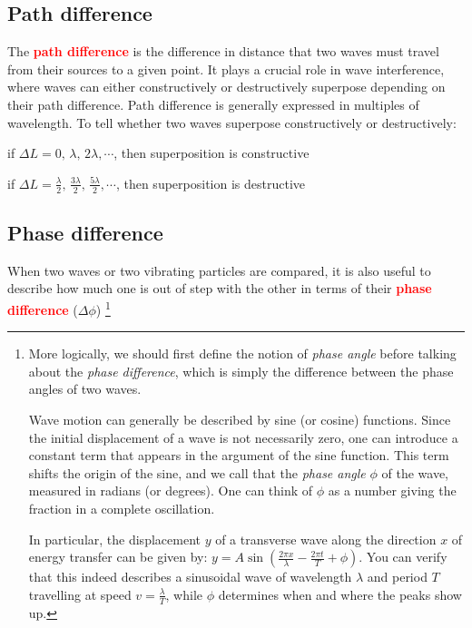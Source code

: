 \documentclass[a4paper,12pt]{book}
\newcommand{\keypoint}[1]{\textbf{\textcolor{red}{#1}}}
\newcommand{\keypoint}[1]{\textbf{\textcolor{red}{#1}}}
\begin{document}
\subsection{Path difference}

The \keypoint{path difference} is the difference in distance that two waves must travel from their sources to a given point. It plays a crucial role in wave interference, where waves can either constructively or destructively superpose depending on their path difference. Path difference is generally expressed in multiples of wavelength. To tell whether two waves superpose constructively or destructively:

{

\centering
\vspace*{6pt}
\begin{tcolorbox}[colframe=red, colback=yellow!30, width=0.65\textwidth]
	\setlength{\baselineskip}{\baselineskip}%
	
	\centering
	
	if ${\Delta L = 0, \, \lambda, \, 2\lambda, \cdots}$, then superposition is constructive
	
	if ${\Delta L = \frac{\lambda}{2}, \, \frac{3\lambda}{2}, \, \frac{5\lambda}{2}, \cdots}$, then superposition is destructive
	
\end{tcolorbox}\vspace*{-4pt}

}

\newpage

\subsection{Phase difference}

When two waves or two vibrating particles are compared, it is also useful to describe how much one is out of step with the other in terms of their \keypoint{phase difference} ($\Delta \phi$)
\footnote{More logically, we should first define the notion of \emph{phase angle} before talking about the \emph{phase difference}, which is simply the difference between the phase angles of two waves.
	
	Wave motion can generally be described by sine (or cosine) functions. Since the initial displacement of a wave is not necessarily zero, one can introduce a constant term that appears in the argument of the sine function. This term shifts the origin of the sine, and we call that the \emph{phase angle} $\phi$ of the wave, measured in radians (or degrees). One can think of $\phi$ as a number giving the fraction in a complete oscillation.
	
	In particular, the displacement $y$ of a transverse wave along the direction $x$ of energy transfer can be given by: $y = A \sin\left( \frac{2\pi x}{\lambda} - \frac{2\pi t}{T} + \phi \right)$. You can verify that this indeed describes a sinusoidal wave of wavelength $\lambda$ and period $T$ travelling at speed $v = \frac{\lambda}{T}$, while $\phi$ determines when and where the peaks show up.}
\end{document}
